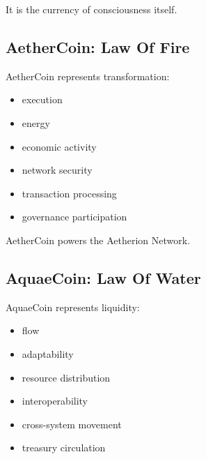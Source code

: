 ﻿\documentclass[12pt]{article}
\begin{document}
It is the currency of consciousness itself.

\subsection{AetherCoin: Law Of Fire}


AetherCoin represents transformation:

\begin{itemize}
  \item execution
\end{itemize}
\begin{itemize}
  \item energy
\end{itemize}
\begin{itemize}
  \item economic activity
\end{itemize}
\begin{itemize}
  \item network security
\end{itemize}
\begin{itemize}
  \item transaction processing
\end{itemize}
\begin{itemize}
  \item governance participation
\end{itemize}

AetherCoin powers the Aetherion Network.

\subsection{AquaeCoin: Law Of Water}


AquaeCoin represents liquidity:

\begin{itemize}
  \item flow
\end{itemize}
\begin{itemize}
  \item adaptability
\end{itemize}
\begin{itemize}
  \item resource distribution
\end{itemize}
\begin{itemize}
  \item interoperability
\end{itemize}
\begin{itemize}
  \item cross-system movement
\end{itemize}
\begin{itemize}
  \item treasury circulation
\end{itemize}
\end{document}
